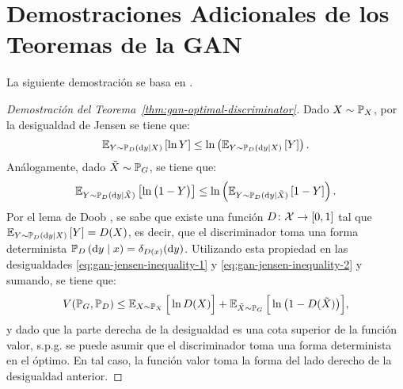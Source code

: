 \chapter{Demostraciones Adicionales de los Teoremas de la GAN}\label{chap:demostraciones-adicionales-teos-gan}
{

    La siguiente demostración se basa en \cite{wikipediagan}.

    \begin{proof}[Demostración del Teorema~\ref{thm:gan-optimal-discriminator}]
        Dado $X \sim \Prob_X$, por la desigualdad de Jensen se tiene que:
        \begin{equation}\label{eq:gan-jensen-inequality-1}
            \Exp_{Y \sim \Prob_D \left( \dd y \mid X \right)} \left[ \ln Y \right]
            \leq \ln \left( \Exp_{Y \sim \Prob_D \left( \dd y \mid X \right)} \left[ Y \right] \right).
        \end{equation}
        Análogamente, dado $\tilde X \sim \Prob_G$, se tiene que:
        \begin{equation}\label{eq:gan-jensen-inequality-2}
            \Exp_{Y \sim \Prob_D ( \dd y \mid \tilde X )} \left[ \ln \qty\big(1 - Y) \right]
            \leq \ln \left( \Exp_{Y \sim \Prob_D ( \dd y \mid \tilde X )} \left[ 1 - Y \right] \right).
        \end{equation}
        Por el lema de Doob \cite[ver Cor. 9.4.11]{sanmartin2018teoria}, se sabe que existe una función $D \colon \mathcal{X} \to [0, 1]$ tal que $\Exp_{Y \sim \Prob_D \left( \dd y \mid X \right)} \left[ Y \right]
            = D(X)$,
        es decir, que el discriminador toma una forma determinista $\Prob_D \left( \dd y \mid x \right) = \delta_{D(x)}(\dd y)$. Utilizando esta propiedad en las desigualdades \eqref{eq:gan-jensen-inequality-1} y \eqref{eq:gan-jensen-inequality-2} y sumando, se tiene que:
        \begin{equation}
            V(\Prob_G, \Prob_D) \leq \Exp_{X \sim \Prob_X} \Big[ \ln D(X) \Big] + \Exp_{\tilde X \sim \Prob_G} \Big[ \ln \qty\big(1 - D(\tilde X)) \Big],
        \end{equation}
        y dado que la parte derecha de la desigualdad es una cota superior de la función valor, s.p.g. se puede asumir que el discriminador toma una forma determinista en el óptimo. En tal caso, la función valor toma la forma del lado derecho de la desigualdad anterior.


\end{proof}}
